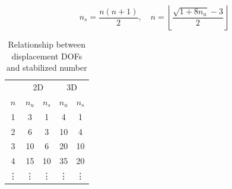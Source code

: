 \begin{equation}
    n_s = \frac{n(n + 1)}{2} 
    ,\quad
    n = \left \lfloor \frac{\sqrt{1 + 8n_u} - 3}{2} \right \rfloor 
\end{equation}

\begin{table}[ht!]
\centering
\caption{Relationship between displacement DOFs and stabilized number}
\label{tab:constraint}
\begin{tabular}{ccccc}
\toprule
    & \multicolumn{2}{c}{2D} & \multicolumn{2}{c}{3D} \\
    $n$ & $n_u$ & $n_s$ & $n_u$ & $n_s$ \\
\midrule
1 & 3  & 1  & 4  & 1 \\
2 & 6  & 3  & 10 & 4 \\
3 & 10 & 6  & 20 & 10\\
4 & 15 & 10 & 35 & 20\\
\vdots & \vdots & \vdots & \vdots & \vdots \\
\bottomrule
\end{tabular}
\end{table}


